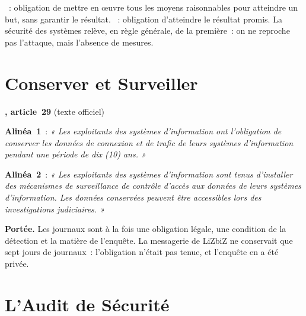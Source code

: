 \begin{boxdef}
~: obligation de mettre en œuvre tous les
moyens raisonnables pour atteindre un but, sans garantir le résultat.
~: obligation d'atteindre le résultat
promis. La sécurité des systèmes relève, en règle générale, de la
première~: on ne reproche pas l'attaque, mais l'absence de mesures.
\end{boxdef}

\section{Conserver et Surveiller}
\label{sec:c05-conserver}

\begin{boxjuris}
\textbf{, article~29} (texte officiel)

\medskip
\textbf{Alinéa~1}~: \textit{« Les exploitants des systèmes d'information
ont l'obligation de conserver les données de connexion et de trafic de
leurs systèmes d'information pendant une période de dix (10) ans. »}

\medskip
\textbf{Alinéa~2}~: \textit{« Les exploitants des systèmes d'information
sont tenus d'installer des mécanismes de surveillance de contrôle d'accès
aux données de leurs systèmes d'information. Les données conservées
peuvent être accessibles lors des investigations judiciaires. »}

\medskip
\textbf{Portée.} Les journaux sont à la fois une obligation légale, une
condition de la détection et la matière de l'enquête. La messagerie de
LiZbiZ ne conservait que sept jours de journaux~: l'obligation n'était
pas tenue, et l'enquête en a été privée.
\end{boxjuris}

\section{L'Audit de Sécurité}
\label{sec:c05-audit}

